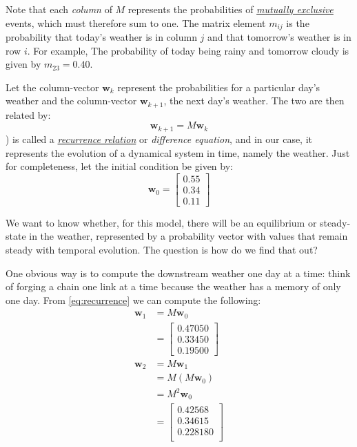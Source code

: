 \documentclass[
  11pt,
  a4paper,
]{article}
\begin{document}
Note that each \emph{column} of \(M\) represents the probabilities of
\href{https://en.wikipedia.org/wiki/Mutual_exclusivity}{\emph{mutually
exclusive}} events, which must therefore sum to one. The matrix element
\(m_{ij}\) is the probability that today's weather is in column \(j\)
and that tomorrow's weather is in row \(i\). For example, The
probability of today being rainy and tomorrow cloudy is given by
\(m_{23} = 0.40\).

Let the column-vector \(\symbf{w}_{k}\) represent the probabilities for
a particular day's weather and the column-vector \(\symbf{ w}_{k+1}\),
the next day's weather. The two are then related by: \begin{equation}
\symbf{w}_{k+1} = M\symbf{w}_{k}
\label{eq:recurrence}\end{equation} ) is called a
\href{https://en.wikipedia.org/wiki/Recurrence_relation}{\emph{recurrence
relation}} or \emph{difference equation}, and in our case, it represents
the evolution of a dynamical system in time, namely the weather. Just
for completeness, let the initial condition be given by:
\begin{equation}
\symbf{w}_{0} = \begin{bmatrix}0.55\\0.34\\0.11\end{bmatrix}
\label{eq:initial}\end{equation}

We want to know whether, for this model, there will be an equilibrium or
steady-state in the weather, represented by a probability vector with
values that remain steady with temporal evolution. The question is how
do we find that out?

One obvious way is to compute the downstream weather one day at a time:
think of forging a chain one link at a time because the weather has a
memory of only one day. From \cref{eq:recurrence} we can compute the
following: \[
\begin{aligned}
\symbf{w}_{1} &= M\symbf {w}_{0}\\
&= \begin{bmatrix}0.47050\\ 0.33450\\0.19500\end{bmatrix}\\
\symbf{w}_{2} &= M\symbf{w}_{1}\\
&= M(M\symbf{w}_{0})\\
&= M^{2}\symbf{w}_{0}\\
&= \begin{bmatrix}0.42568\\0.34615\\0.228180\\\end{bmatrix}
\end{aligned}
\]
\end{document}
